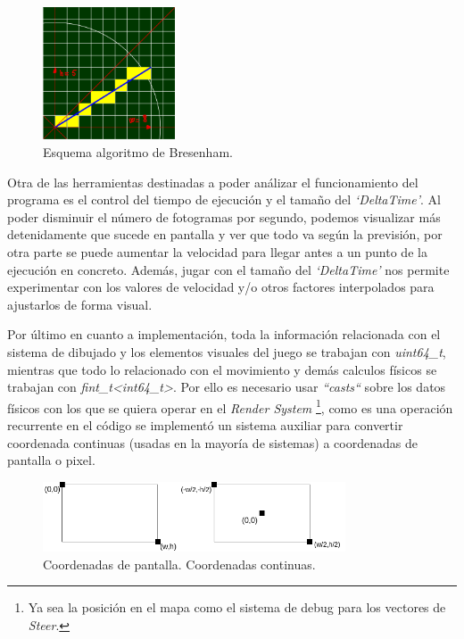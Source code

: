 \begin{figure}[ht]
\centering
\includegraphics[width=0.35\textwidth]{imagenes/diario_desarrollo/linea_ideal.png}
\caption{Esquema algoritmo de Bresenham.}
\label{fig:bresenham}
\end{figure} 

Otra de las herramientas destinadas a poder análizar el funcionamiento del programa es
el control del tiempo de ejecución y el tamaño del \textit{`DeltaTime'}. Al poder disminuir
el número de fotogramas por segundo, podemos visualizar más detenidamente que sucede en
pantalla y ver que todo va según la previsión, por otra parte se puede aumentar la velocidad
para llegar antes a un punto de la ejecución en concreto. Además, jugar con el tamaño del
\textit{`DeltaTime'} nos permite experimentar con los valores de velocidad y/o otros factores
interpolados para ajustarlos de forma visual. 

Por último en cuanto a implementación, toda la información relacionada con el sistema de 
dibujado y los elementos visuales del juego se trabajan con \textit{uint64\_t}, mientras que
todo lo relacionado con el movimiento y demás calculos físicos se trabajan con
\textit{fint\_t\textless int64\_t\textgreater}. Por ello es necesario usar \textit{``casts``}
sobre los datos físicos con los que se quiera operar en el \textit{Render System}
\footnote{Ya sea la posición en el mapa como el sistema de debug para los vectores de
\textit{Steer}.}, como es una operación recurrente en el código se implementó un sistema 
auxiliar para convertir coordenada continuas (usadas en la mayoría de sistemas) a coordenadas de 
pantalla o pixel. 

\begin{figure}[ht]
\centering
\includegraphics[width=0.8\textwidth]{imagenes/diario_desarrollo/sis_coords.png}\\
\hspace{-8mm} Coordenadas de pantalla. \hspace{16mm}  Coordenadas continuas.
\label{fig:sis_coords}
\end{figure} 

